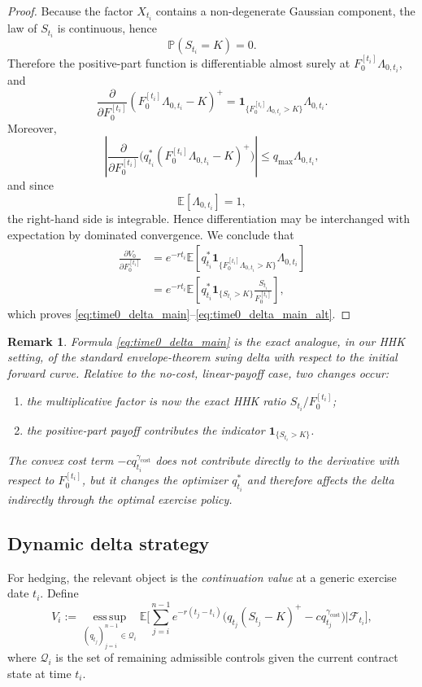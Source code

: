 \documentclass[10pt,a4paper,reqno]{amsart}
\newcommand{\<}{\langle}
\renewcommand{\>}{\rangle}
\newtheorem{remark}[theorem]{Remark}
\theoremstyle{example}
\begin{document}
\begin{proof}
Because the factor $X_{t_i}$ contains a non-degenerate Gaussian component, the law of $S_{t_i}$ is
continuous, hence
\[
\mathbb{P}(S_{t_i}=K)=0.
\]
Therefore the positive-part function is differentiable almost surely at
$F_0^{[t_i]}\Lambda_{0,t_i}$, and
\[
\frac{\partial}{\partial F_0^{[t_i]}}
(F_0^{[t_i]}\Lambda_{0,t_i}-K)^+
=
\mathbf{1}_{\{F_0^{[t_i]}\Lambda_{0,t_i}>K\}}
\Lambda_{0,t_i}.
\]
Moreover,
\[
\left|
\frac{\partial}{\partial F_0^{[t_i]}}
\Big(
q_{t_i}^*
(F_0^{[t_i]}\Lambda_{0,t_i}-K)^+
\Big)
\right|
\le
q_{\max}\Lambda_{0,t_i},
\]
and since
\[
\mathbb{E}[\Lambda_{0,t_i}] = 1,
\]
the right-hand side is integrable. Hence differentiation may be interchanged with expectation by dominated
convergence. We conclude that
\begin{align*}
\frac{\partial V_0}{\partial F_0^{[t_i]}}
&=
e^{-r t_i}
\mathbb{E}\!\left[
q_{t_i}^*
\mathbf{1}_{\{F_0^{[t_i]}\Lambda_{0,t_i}>K\}}
\Lambda_{0,t_i}
\right] \\
&=
e^{-r t_i}
\mathbb{E}\!\left[
q_{t_i}^*
\mathbf{1}_{\{S_{t_i}>K\}}
\frac{S_{t_i}}{F_0^{[t_i]}}
\right],
\end{align*}
which proves \eqref{eq:time0_delta_main}--\eqref{eq:time0_delta_main_alt}.
\end{proof}

\begin{remark}
\label{rem:delta_interpretation}
Formula \eqref{eq:time0_delta_main} is the exact analogue, in our HHK setting, of the standard
envelope-theorem swing delta with respect to the initial forward curve. Relative to the no-cost,
linear-payoff case, two changes occur:
\begin{enumerate}
    \item the multiplicative factor is now the exact HHK ratio $S_{t_i}/F_0^{[t_i]}$;
    \item the positive-part payoff contributes the indicator $\mathbf{1}_{\{S_{t_i}>K\}}$.
\end{enumerate}
The convex cost term $-c q_{t_i}^{\gamma_{\mathrm{cost}}}$ does not contribute directly to the derivative with
respect to $F_0^{[t_i]}$, but it changes the optimizer $q_{t_i}^*$ and therefore affects the delta indirectly
through the optimal exercise policy.
\end{remark}

\subsection{Dynamic delta strategy}

For hedging, the relevant object is the \emph{continuation value} at a generic exercise date $t_i$.
Define
\begin{equation}
\label{eq:continuation_value}
V_i
:=
\operatorname*{ess\,sup}_{(q_{t_j})_{j=i}^{n-1}\in\mathcal{Q}_i}
\mathbb{E}\!\Bigg[
\sum_{j=i}^{n-1}
e^{-r(t_j-t_i)}
\Big(
q_{t_j}(S_{t_j}-K)^+
-
c q_{t_j}^{\gamma_{\mathrm{cost}}}
\Big)
\Bigg|
\mathcal{F}_{t_i}
\Bigg],
\end{equation}
where $\mathcal{Q}_i$ is the set of remaining admissible controls given the current contract state at
time $t_i$.
\end{document}

